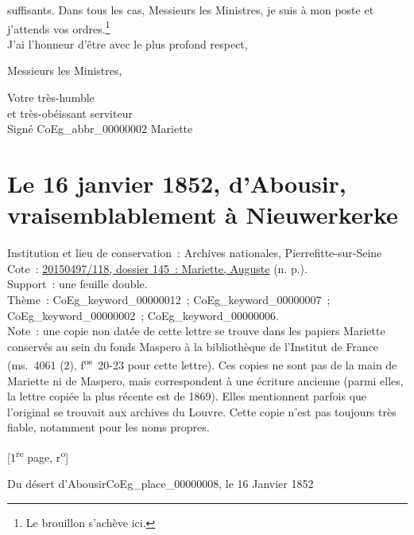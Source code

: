 \documentclass{book}
\begin{document}
suffisants. Dans tous les cas, Messieurs les Ministres, je suis à mon poste et j’attends vos ordres.\footnote{Le brouillon s’achève ici.}\\
\indent J’ai l’honneur d’être avec le plus profond respect,
\begin{center}Messieurs les Ministres,\end{center}
\begin{center}\hspace{5cm}Votre très-humble\\
\hspace{5cm}et très-obéissant serviteur\\
\hspace{5cm} Signé \gls{CoEg_abbr_00000002} Mariette\end{center}

\hypertarget{CoEg_Mariette_1852-01-16}{}
\section*{Le 16 janvier 1852, d’Abousir, vraisemblablement à Nieuwerkerke} 
{\footnotesize
\noindent Institution et lieu de conservation~: Archives nationales, Pierrefitte-sur-Seine\\
Cote~: \hyperlink{CoEg_Mariette_ms_001}{20150497/118, dossier 145~: Mariette, Auguste} (n. p.).\\
Support~: une feuille double.\\
Thème~: \gls{CoEg_keyword_00000012}~; \gls{CoEg_keyword_00000007}~; \gls{CoEg_keyword_00000002}~; \gls{CoEg_keyword_00000006}.\\
Note~: une copie non datée de cette lettre se trouve dans les papiers Mariette conservés au sein du fonds Maspero à la bibliothèque de l’Institut de France (ms.~4061 (2), f\textsuperscript{os}~20-23 pour cette lettre). Ces copies ne sont pas de la main de Mariette ni de Maspero, mais correspondent à une écriture ancienne (parmi elles, la lettre copiée la plus récente est de 1869). Elles mentionnent parfois que l’original se trouvait aux archives du Louvre. Cette copie n’est pas toujours très fiable, notamment pour les noms propres.
\begin{center} {[1\textsuperscript{re} page, r\textsuperscript{o}]}\end{center}}
\begin{flushright}Du désert d’Abousir\gls{CoEg_place_00000008}, le 16 Janvier 1852\end{flushright}
\end{document}
